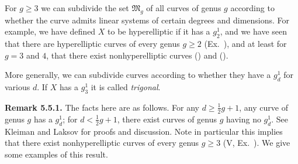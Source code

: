 {For $g\ge3$ we can subdivide the set $\mathfrak M_g$ of all curves of genus $g$ according to whether the curve admits linear systems of certain degrees and dimensions. For example, we have defined $X$ to be hyperelliptic if it has a $g_2^1$, and we have seen that there are hyperelliptic curves of every genus $g\ge2$ (Ex.~), and at least for $g=3$ and $4$, that there exist nonhyperelliptic curves () and ().

More generally, we can subdivide curves according to whether they have a $g_d^1$ for various $d$. If $X$ has a $g_3^1$ it is called \emph{trigonal}.

\medskip
\noindent\hypertarget{result-IV-5.5.1}{}\textbf{Remark 5.5.1.} The facts here are as follows. For any $d\ge\frac12g+1$, any curve of genus $g$ has a $g_d^1$; for $d<\frac12g+1$, there exist curves of genus $g$ having no $g_d^1$. See Kleiman and Laksov  for proofs and discussion. Note in particular this implies that there exist nonhyperelliptic curves of every genus $g\ge3$ (V, Ex.~). We give some examples of this result.}
